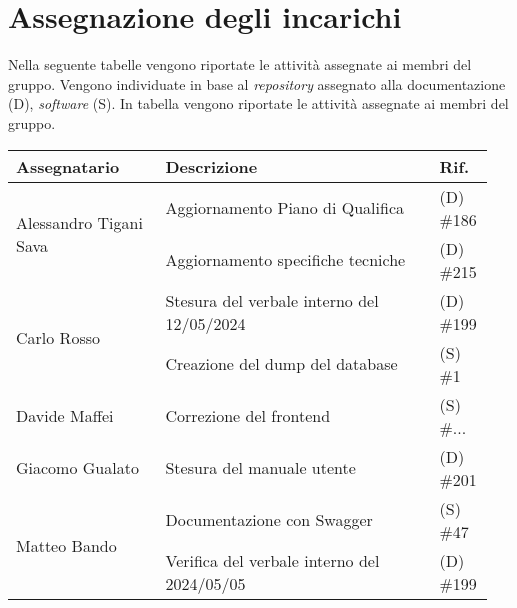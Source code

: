 \section{Assegnazione degli incarichi}
Nella seguente tabelle vengono riportate le attività assegnate ai membri del 
gruppo. Vengono individuate in base al \textit{repository} assegnato alla 
documentazione (D), \textit{software} (S).
In tabella vengono riportate le attività assegnate ai membri del gruppo.
\begin{center}
	{
		\renewcommand{\arraystretch}{1.5}
		\begin{tabular}{p{0.30\linewidth}|p{0.55\linewidth}|p{0.10\linewidth}}
			\textbf{Assegnatario}        & \textbf{Descrizione} & \textbf{Rif.} \\

			\hline
			\multirow{2}{*}{Alessandro Tigani Sava }      & Aggiornamento Piano di Qualifica & (D) \#186	 \\
			\cline{2-3}
                                                          & Aggiornamento specifiche tecniche  & (D) \#215 \\
            \hline
			\multirow{2}{*}{Carlo Rosso} & Stesura del verbale interno del 12/05/2024	& (D) \#199                              \\
			\cline{2-3}
			                             & Creazione del dump del database				& (S) \#1   \\
			\hline
			Davide Maffei                & Correzione del frontend						& (S) \#... \\
			\hline
			Giacomo Gualato				 & Stesura del manuale utente					& (D) \#201 \\
			\hline
			\multirow{2}{*}{Matteo Bando} & Documentazione con Swagger	&	(S) \#47		\\
            \cline{2-3}
                                            & Verifica del verbale interno del 2024/05/05 & (D) \#199\\
             \hline
		\end{tabular}
	}
\end{center}
